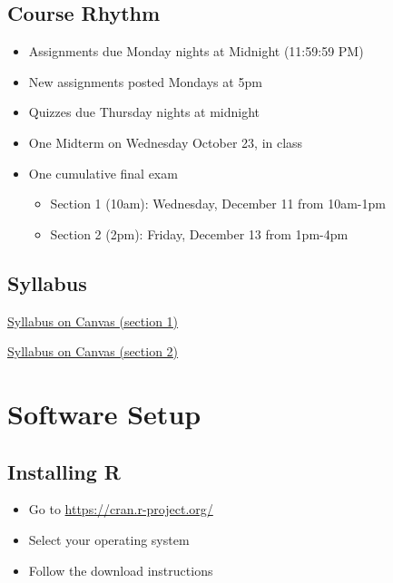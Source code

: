 \documentclass[
  letterpaper,
  DIV=11,
  numbers=noendperiod]{scrreprt}
\begin{document}
\section{Course Rhythm}\label{course-rhythm}

\begin{itemize}
\item
  Assignments due Monday nights at Midnight (11:59:59 PM)
\item
  New assignments posted Mondays at 5pm
\item
  Quizzes due Thursday nights at midnight
\item
  One Midterm on Wednesday October 23, in class
\item
  One cumulative final exam

  \begin{itemize}
  \item
    Section 1 (10am): Wednesday, December 11 from 10am-1pm
  \item
    Section 2 (2pm): Friday, December 13 from 1pm-4pm
  \end{itemize}
\end{itemize}

\section{Syllabus}\label{syllabus}

\href{https://canvas.calpoly.edu/courses/140321/assignments/syllabus}{Syllabus
on Canvas (section 1)}

\href{https://canvas.calpoly.edu/courses/133958/assignments/syllabus}{Syllabus
on Canvas (section 2)}

\chapter{Software Setup}\label{software-setup}

\section{Installing R}\label{installing-r}

\begin{itemize}
\item
  Go to \url{https://cran.r-project.org/}
\item
  Select your operating system
\item
  Follow the download instructions
\end{itemize}
\end{document}
